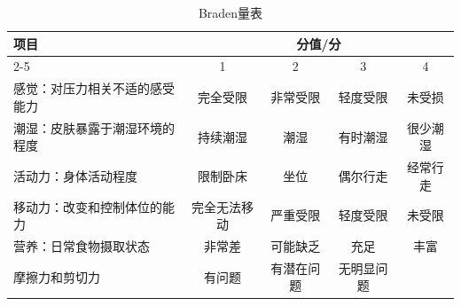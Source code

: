 \documentclass[11pt, a4paper]{ctexart}
\begin{document}
\begin{table}[htbp]
\centering
\caption{Braden量表}
\small
\begin{tabular}{|p{4cm}|c|c|c|c|}
\hline
\multirow{2}{*}{\textbf{项目}} & \multicolumn{4}{c|}{\textbf{分值/分}} \\
\cline{2-5}
 & 1 & 2 & 3 & 4 \\
\hline
感觉：对压力相关不适的感受能力 & 完全受限 & 非常受限 & 轻度受限 & 未受损 \\
潮湿：皮肤暴露于潮湿环境的程度 & 持续潮湿 & 潮湿 & 有时潮湿 & 很少潮湿 \\
活动力：身体活动程度 & 限制卧床 & 坐位 & 偶尔行走 & 经常行走 \\
移动力：改变和控制体位的能力 & 完全无法移动 & 严重受限 & 轻度受限 & 未受限 \\
营养：日常食物摄取状态 & 非常差 & 可能缺乏 & 充足 & 丰富 \\
摩擦力和剪切力 & 有问题 & 有潜在问题 & 无明显问题 &  \\
\hline
\end{tabular}
\end{table}
\end{document}
